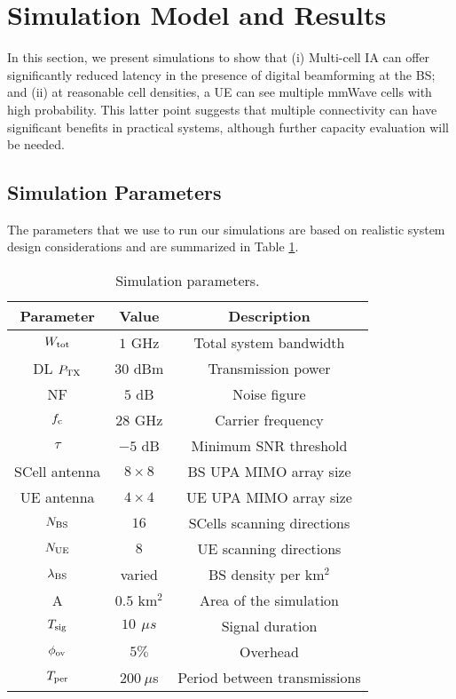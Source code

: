 \documentclass[conference,a4paper]{IEEEtran}
\renewcommand{\arraystretch}{2}
\begin{document}
\section{Simulation Model and Results}
\label{sec:res}

In this section, we present simulations to show that
(i) Multi-cell IA can offer significantly reduced latency
in the presence of digital beamforming at the BS; and 
(ii) at reasonable cell densities, a UE can see multiple mmWave cells with high probability.
This latter point suggests that multiple connectivity can have significant benefits in practical systems,
although further capacity evaluation will be needed.

\subsection{Simulation Parameters}

The parameters that we use to run our simulations are based on realistic system design considerations and are summarized in Table \ref{tab:params}.
 \renewcommand{\arraystretch}{1.3}
\begin{table}[!t]
\centering
\begin{tabular}{|c|c|c|}
\hline
\textbf{Parameter} & \textbf{Value} & \textbf{Description}\\
\toprule
\hline
 $W_{\rm tot}$ & $1$ GHz & Total system bandwidth\\
\hline
DL  $P_{\rm TX}$ & $30$ dBm & Transmission power \\
\hline
 NF  & $5$ dB & Noise figure \\
\hline
$f_{\rm c}$ & $28$ GHz & Carrier frequency \\
\hline
$\tau$ & $ -5$ dB &  Minimum SNR threshold \\
\hline
  SCell antenna & $8 \times 8$  & BS UPA MIMO array size  \\
\hline
UE antenna & $4 \times 4$ & UE UPA MIMO array size\\
\hline
$N_{\rm BS}$& $16$  & SCells scanning directions  \\
\hline
$N_{\rm UE}$& $8$  & UE scanning directions  \\
\hline
 $\lambda_{\rm BS}$ & varied & BS density per km$^2$ \\
\hline
 A & $0.5$ km$^2$ & Area of the simulation \\
\hline
$T_{\rm sig}$ & $10 \, \: \mu s$& Signal duration \\
\hline
$\phi_{\rm ov}$ & $5\%$ & Overhead\\
\hline
$T_{\rm per}$ & $200 \: \mu$s & Period between transmissions \\
\hline
\end{tabular}
\caption{Simulation parameters.}
\label{tab:params}
\end{table}
\end{document}
